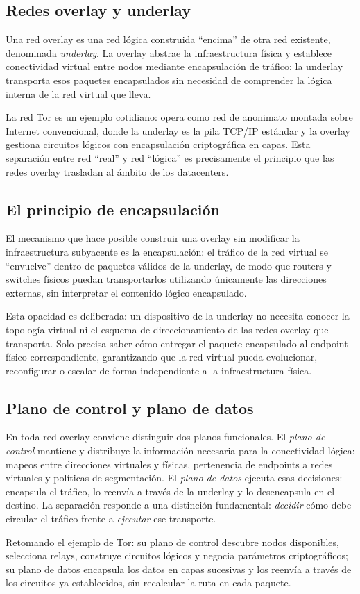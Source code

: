 
\subsection{Redes overlay y underlay}

Una red overlay es una red lógica construida ``encima'' de otra red existente, denominada \textit{underlay}. La overlay abstrae la infraestructura física y establece conectividad virtual entre nodos mediante encapsulación de tráfico; la underlay transporta esos paquetes encapsulados sin necesidad de comprender la lógica interna de la red virtual que lleva.

La red Tor es un ejemplo cotidiano: opera como red de anonimato montada sobre Internet convencional, donde la underlay es la pila TCP/IP estándar y la overlay gestiona circuitos lógicos con encapsulación criptográfica en capas. Esta separación entre red ``real'' y red ``lógica'' es precisamente el principio que las redes overlay trasladan al ámbito de los datacenters.

\subsection{El principio de encapsulación}

El mecanismo que hace posible construir una overlay sin modificar la infraestructura subyacente es la encapsulación: el tráfico de la red virtual se ``envuelve'' dentro de paquetes válidos de la underlay, de modo que routers y switches físicos puedan transportarlos utilizando únicamente las direcciones externas, sin interpretar el contenido lógico encapsulado.

Esta opacidad es deliberada: un dispositivo de la underlay no necesita conocer la topología virtual ni el esquema de direccionamiento de las redes overlay que transporta. Solo precisa saber cómo entregar el paquete encapsulado al endpoint físico correspondiente, garantizando que la red virtual pueda evolucionar, reconfigurar o escalar de forma independiente a la infraestructura física.

\subsection{Plano de control y plano de datos}

En toda red overlay conviene distinguir dos planos funcionales. El \textit{plano de control} mantiene y distribuye la información necesaria para la conectividad lógica: mapeos entre direcciones virtuales y físicas, pertenencia de endpoints a redes virtuales y políticas de segmentación. El \textit{plano de datos} ejecuta esas decisiones: encapsula el tráfico, lo reenvía a través de la underlay y lo desencapsula en el destino. La separación responde a una distinción fundamental: \textit{decidir} cómo debe circular el tráfico frente a \textit{ejecutar} ese transporte.

Retomando el ejemplo de Tor: su plano de control descubre nodos disponibles, selecciona relays, construye circuitos lógicos y negocia parámetros criptográficos; su plano de datos encapsula los datos en capas sucesivas y los reenvía a través de los circuitos ya establecidos, sin recalcular la ruta en cada paquete.